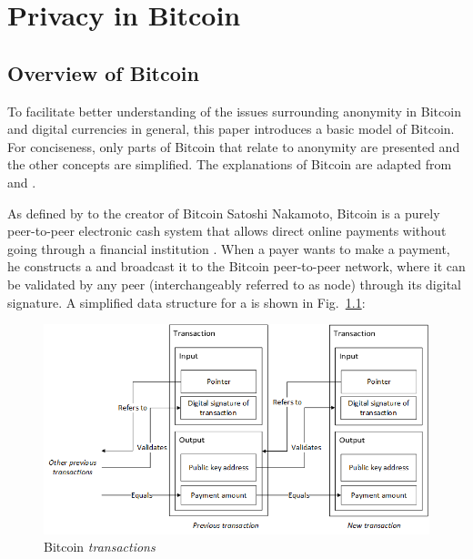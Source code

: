 
\ifpdf
\graphicspath{{Chapter1/Figs/}}
\else
\graphicspath{{Chapter1/Figs/}}
\fi

\chapter{Privacy in Bitcoin}  %
\label{ch:Privacy in Bitcoin}
\section{Overview of Bitcoin} %
\label{sec:1-Overview of Bitcoin}
To facilitate better understanding of the issues surrounding anonymity in Bitcoin and digital currencies in general, this paper introduces a basic model of Bitcoin. For conciseness, only parts of Bitcoin that relate to anonymity are presented and the other concepts are simplified. The explanations of Bitcoin are adapted from \cite{andreas2014mastering} and \cite{narayanan2016bitcoin}.

As defined by to the creator of Bitcoin Satoshi Nakamoto, Bitcoin is a purely peer-to-peer electronic cash system that allows direct online payments without going through a financial institution \cite{Nakamoto2008}.  When a payer wants to make a payment, he constructs a \kwTransaction{}{} and broadcast it to the Bitcoin peer-to-peer network, where it can be validated by any peer (interchangeably referred to as node) through its digital signature. A simplified data structure for a \kwTransaction{}{} is shown in Fig.~\ref{fig:bitcoin_transactions}:

\begin{figure}[H]
	\begin{center}
		\includegraphics[scale=0.7]{bitcoin-transactions} 
		\caption{Bitcoin \textit{transactions}}
		\label{fig:bitcoin_transactions} 
	\end{center}
\end{figure}

